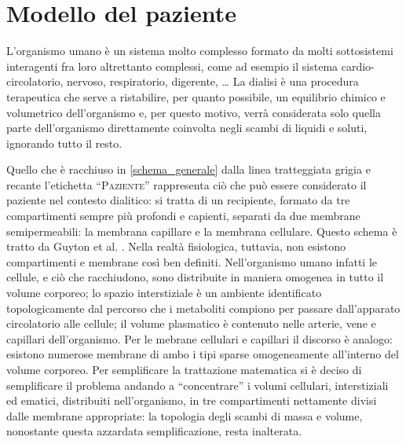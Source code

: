 \section{Modello del paziente}
L'organismo umano è un sistema molto complesso formato da molti sottosistemi interagenti fra loro altrettanto complessi, come ad esempio il sistema cardio-circolatorio, nervoso, respiratorio, digerente, \ldots
La dialisi è una procedura terapeutica che serve a ristabilire, per quanto possibile, un equilibrio chimico e volumetrico dell'organismo e, per questo motivo, verrà considerata solo quella parte dell'organismo direttamente coinvolta negli scambi di liquidi e soluti, ignorando tutto il resto.

Quello che è racchiuso in \figurename\ref{schema_generale} dalla linea tratteggiata grigia e recante l'etichetta ``\textsc{Paziente}'' rappresenta ciò che può essere considerato il paziente nel contesto dialitico: si tratta di un recipiente, formato da tre compartimenti sempre più profondi e capienti, separati da due membrane semipermeabili: la membrana capillare e la membrana cellulare. Questo schema è tratto da Guyton et al. \cite{guyton}. Nella realtà fisiologica, tuttavia, non esistono compartimenti e membrane così ben definiti. Nell'organismo umano infatti le cellule, e ciò che racchiudono, sono distribuite in maniera omogenea in tutto il volume corporeo; lo spazio interstiziale è un ambiente identificato topologicamente dal percorso che i metaboliti compiono per passare dall'apparato circolatorio alle cellule; il volume plasmatico è contenuto nelle arterie, vene e capillari dell'organismo. Per le mebrane cellulari e capillari il discorso è analogo: esistono numerose membrane di ambo i tipi sparse omogeneamente all'interno del volume corporeo. Per semplificare la trattazione matematica si è deciso di semplificare il problema andando a ``concentrare'' i volumi cellulari, interstiziali ed ematici, distribuiti nell'organismo, in tre compartimenti nettamente divisi dalle membrane appropriate: la topologia degli scambi di massa e volume, nonostante questa azzardata semplificazione, resta inalterata.

